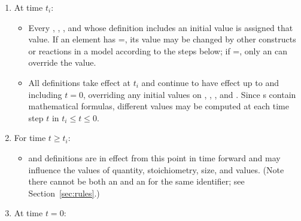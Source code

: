\begin{enumerate}

\item At time $t_i$:
  \begin{itemize}
    
  \item Every \Species, \SpeciesReference, \Compartment, and \Parameter whose
    definition includes an initial value is assigned that value.
    If an element has =, its
    value may be changed by other constructs or reactions in a
    model according to the steps below; if
    =, only an \InitialAssignment can
    override the value.
    
  \item All \InitialAssignment definitions take effect at $t_i$
    and continue to have effect up to and including $t = 0$,
    overriding any initial values on \Species, \SpeciesReference,
    \Compartment, and \Parameter.  Since \InitialAssignment{}s
    contain mathematical formulas, different values may be
    computed at each time step $t$ in $t_i \leq t \leq 0$.


  \end{itemize}
  
\item For time $t \geq t_i$:
  \begin{itemize}
    
  \item \AssignmentRule and \AlgebraicRule definitions are in
    effect from this point in time forward and may influence the
    values of \Species quantity, \SpeciesReference stoichiometry,
    \Compartment size, and \Parameter
    values.  (Note there cannot be both an \AssignmentRule and an
    \InitialAssignment for the same identifier; see
    Section~\ref{sec:rules}.)

  \end{itemize}
  
\item At time $t = 0$:
  \begin{itemize}  
    

\end{itemize}
\end{enumerate}
